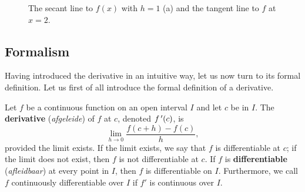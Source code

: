 \begin{figure}
\centering
{}
\qquad
{}
\caption{The secant line to $f(x)$ with $h=1$ (a) and the tangent line to $f$ at $x=2$. }
\end{figure}
\pagebreak
\fi


\subsection{Formalism}
\ifcourse Having introduced the derivative in an intuitive way, let us now turn to its formal definition. \fi
\ifvc Let us first of all introduce the formal definition of a derivative. \fi

\begin{definition}\label{def:derivative_at_a_point}
Let $f$ be a continuous function on an open interval $I$ and let $c$ be in $I$. The \textbf{derivative} (\textit{afgeleide})  of $f$ at $c$, denoted $f\,'(c)$, is 
$$\lim_{h\to 0}\frac{f(c+h)-f(c)}{h},$$
 provided the limit exists. If the limit exists, we say that $f$ is differentiable at $c$; if the limit does not exist, then $f$ is not differentiable at $c$. If $f$ is \textbf{differentiable} (\textit{afleidbaar}) at every point in $I$, then $f$ is differentiable on $I$. Furthermore, we call  $f$ continuously differentiable over $I$ if $f'$ is continuous over $I$. 
\end{definition}

